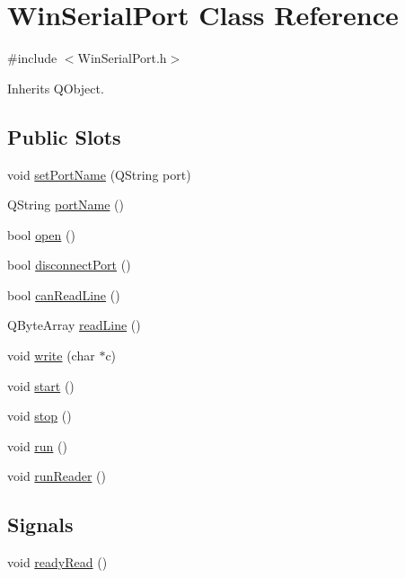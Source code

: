 \hypertarget{class_win_serial_port}{\section{Win\+Serial\+Port Class Reference}
\label{class_win_serial_port}
}


{\ttfamily \#include $<$Win\+Serial\+Port.\+h$>$}



Inherits Q\+Object.

\subsection*{Public Slots}
\begin{DoxyCompactItemize}
\item 
void \hyperlink{class_win_serial_port_a244f15f38f14d491f767a22044fe58d7}{set\+Port\+Name} (Q\+String port)
\item 
Q\+String \hyperlink{class_win_serial_port_af81ba84a86b2b73a2391a908313fa88c}{port\+Name} ()
\item 
bool \hyperlink{class_win_serial_port_a46e72504244cb24dc7772169b9986cd0}{open} ()
\item 
bool \hyperlink{class_win_serial_port_a4d6afa889bff29a3be226c32a0cfd877}{disconnect\+Port} ()
\item 
bool \hyperlink{class_win_serial_port_a55e9f80f4464d95ab49182f473e554e9}{can\+Read\+Line} ()
\item 
Q\+Byte\+Array \hyperlink{class_win_serial_port_ac0ca65fc5c348184ac4ec33cc76b8b9b}{read\+Line} ()
\item 
void \hyperlink{class_win_serial_port_a36de108f8008283a3f0fafd55fa0ed79}{write} (char $\ast$c)
\item 
void \hyperlink{class_win_serial_port_a91f46c57689d7b559c98181f6b17d9a4}{start} ()
\item 
void \hyperlink{class_win_serial_port_a9f3a0048530479d6b84ee141c66d602c}{stop} ()
\item 
void \hyperlink{class_win_serial_port_a2bc988e61c0a555af6952c27f17e7d66}{run} ()
\item 
void \hyperlink{class_win_serial_port_a5ed856188efe6e93e8e45d9e1d6539ce}{run\+Reader} ()
\end{DoxyCompactItemize}
\subsection*{Signals}
\begin{DoxyCompactItemize}
\item 
void \hyperlink{class_win_serial_port_acbb63784cc01d4d13002f8ec174ee21a}{ready\+Read} ()
\end{DoxyCompactItemize}

